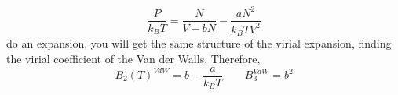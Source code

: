 \documentclass[../main/main.tex]{subfiles}
\begin{document}
\begin{equation}
  \frac{P}{k_B T} = \frac{N}{V-bN} - \frac{a N^2}{k_B T V^2}
\end{equation}
do an expansion, you will get the same structure of the virial expansion, finding the virial coefficient of the Van der Walls. Therefore,
\begin{equation}
  B_2 (T)^{VdW} = b - \frac{a}{k_B T} \qquad B_3^{VdW} = b^2
\end{equation}
\end{document}
